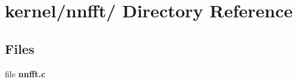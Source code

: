 \hypertarget{dir_000027}{
\section{kernel/nnfft/ Directory Reference}
\label{dir_000027}
}
\subsection*{Files}
\begin{CompactItemize}
\item 
file {\bf nnfft.c}
\end{CompactItemize}
